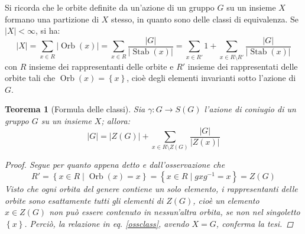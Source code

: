 \documentclass[12pt]{scrartcl}
\theoremstyle{style}
\newtheorem{teorema}{Teorema}[section]
\numberwithin{equation}{subsection}
\begin{document}
Si ricorda che le orbite definite da un'azione di un gruppo $G$ su un insieme $X$ formano una partizione di $X$ stesso, in quanto sono delle classi di equivalenza.
Se $\lvert X \rvert < \infty$, si ha:
\begin{equation}\label{ossclass}
\lvert X \rvert  = \sum_{x \in R}^{} \lvert \operatorname{Orb} (x) \rvert = \sum_{x \in R}^{} \frac{\lvert G \rvert }{\lvert \operatorname{Stab} (x) \rvert } = \sum_{x \in R'}^{} 1 + \sum_{x \in R \setminus R '}^{} \frac{\lvert G \rvert }{\lvert \operatorname{Stab} (x) \rvert }
\end{equation}
con $R$ insieme dei rappresentanti delle orbite e $R'$ insieme dei rappresentati delle orbite tali che $\operatorname{Orb} (x) = \left\{ x \right\} $, cio\`e degli elementi invarianti sotto l'azione di $G$. 
\begin{teorema}
	[Formula delle classi]
	Sia $\gamma:G \to S(G)$ l'azione di coniugio di un gruppo $G$ su un insieme $X$; allora:
	\begin{equation*}
		\lvert G \rvert  = |Z(G)| + \sum_{x \in R \setminus Z(G)}^{} \frac{\lvert G \rvert }{\lvert Z(x) \rvert }
	\end{equation*}
	\begin{proof}
		Segue per quanto appena detto e dall'osservazione che
		\[
		R' = \left\{ x \in R  \mid \operatorname{Orb} (x) = x \right\} = \left\{ x \in R  \mid gxg^{-1} = x \right\} = Z(G)
		\] 
		Visto che ogni orbita del genere contiene un solo elemento, i rappresentanti delle orbite sono esattamente tutti gli elementi di $Z(G)$, cio\`e un elemento $x \in Z(G)$ non pu\`o essere contenuto in nessun'altra orbita, se non nel singoletto $\left\{ x \right\} $.
		Perci\`o, la relazione in eq. \ref{ossclass}, avendo $X=G$, conferma la tesi.
	\end{proof}
\end{teorema}
\end{document}
